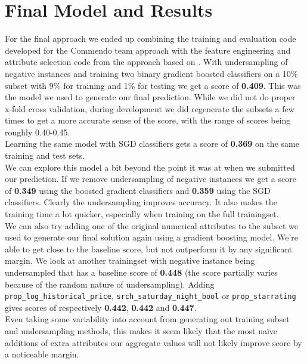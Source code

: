\documentclass{llncs}
\begin{document}
\section{Final Model and Results}
\label{sec:final_model}
For the final approach we ended up combining the training and evaluation code developed for the Commendo team approach with the feature engineering and attribute selection code from the approach based on \cite{DBLP:journals/corr/LiuXZYPLSW13}. With undersampling of negative instances and training two binary gradient boosted classifiers on a 10\% subset with 9\% for training and 1\% for testing we get a score of \textbf{0.409}. This was the model we used to generate our final prediction. While we did not do proper x-fold cross validation, during development we did regenerate the subsets a few times to get a more accurate sense of the score, with the range of scores being roughly 0.40-0.45.\\
Learning the same model with SGD classifiers gets a score of \textbf{0.369} on the same training and test sets. \\
We can explore this model a bit beyond the point it was at when we submitted our prediction. If we remove undersampling of negative instances we get a score of \textbf{0.349} using the boosted gradient classifiers and \textbf{0.359} using the SGD classifiers. Clearly the undersampling improves accuracy. It also makes the training time a lot quicker, especially when training on the full trainingset.\\
We can also try adding one of the original numerical attributes to the subset we used to generate our final solution again using a gradient boosting model. We're able to get close to the baseline score, but not outperform it by any significant margin. We look at another trainingset with negative instance being undersampled that has a baseline score of \textbf{0.448} (the score partially varies because of the random nature of undersampling). Adding \verb!prop_log_historical_price!, \verb!srch_saturday_night_bool! or \verb!prop_starrating! gives scores of respectively \textbf{0.442}, \textbf{0.442} and \textbf{0.447}.\\
Even taking some variability into account from generating out training subset and undersampling methods, this makes it seem likely that the most na\"ive additions of extra attributes our aggregate values will not likely improve score by a noticeable margin.
\end{document}
